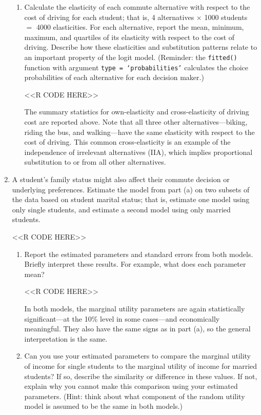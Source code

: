 \documentclass[11pt,letterpaper]{article}
\begin{document}
\begin{enumerate}[label=\alph*., leftmargin=*]
\begin{enumerate}[label=\roman*.]
		\item Calculate the elasticity of each commute alternative with respect to the cost of driving for each student; that is, 4 alternatives $\times$ 1000 students $=$ 4000 elasticities. For each alternative, report the mean, minimum, maximum, and quartiles of its elasticity with respect to the cost of driving. Describe how these elasticities and substitution patterns relate to an important property of the logit model. (Reminder: the \texttt{fitted()} function with argument \texttt{type = `probabilities'} calculates the choice probabilities of each alternative for each decision maker.)

		<<R CODE HERE>>

		The summary statistics for own-elasticity and cross-elasticity of driving cost are reported above. Note that all three other alternatives---biking, riding the bus, and walking---have the same elasticity with respect to the cost of driving. This common cross-elasticity is an example of the independence of irrelevant alternatives (IIA), which implies proportional substitution to or from all other alternatives.
	\end{enumerate}

	\item A student's family status might also affect their commute decision or underlying preferences. Estimate the model from part (a) on two subsets of the data based on student marital status; that is, estimate one model using only single students, and estimate a second model using only married students.

	<<R CODE HERE>>

	\begin{enumerate}[label=\roman*.]
		\item Report the estimated parameters and standard errors from both models. Briefly interpret these results. For example, what does each parameter mean?

		<<R CODE HERE>>

		In both models, the marginal utility parameters are again statistically significant---at the 10\% level in some cases---and economically meaningful. They also have the same signs as in part (a), so the general interpretation is the same.

		\item Can you use your estimated parameters to compare the marginal utility of income for single students to the marginal utility of income for married students? If so, describe the similarity or difference in these values. If not, explain why you cannot make this comparison using your estimated parameters. (Hint: think about what component of the random utility model is assumed to be the same in both models.)


\end{enumerate}
\end{enumerate}
\end{document}

